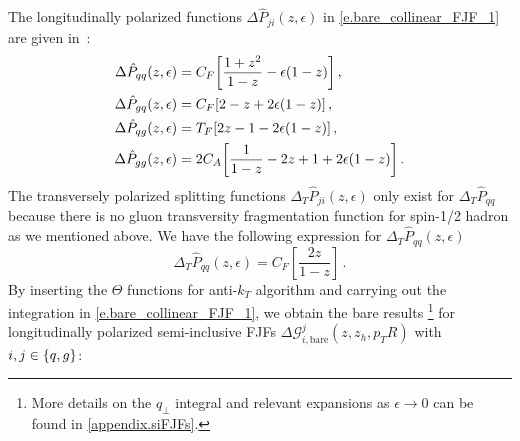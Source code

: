 \documentclass[a4paper, 11 pt]{article}
\begin{document}
The longitudinally polarized functions $\Delta  \hat{P}_{ji} (z , \epsilon)$ in \cref{e.bare_collinear_FJF_1} are given in~\cite{Vogelsang:1996im}:
\begin{align}
\Delta \hat{P}_{qq} (z, \epsilon)
& =
C_F \bqty{\frac{1 + z^2}{1 - z} - \epsilon (1 - z)}
\, , \label{e.Delta_P_qq} \\
\Delta \hat{P}_{gq} (z, \epsilon)
& =
C_F \bqty{2 - z + 2 \epsilon (1 - z)}
\, , \label{e.Delta_P_gq} \\
\Delta \hat{P}_{qg} (z, \epsilon)
& =
T_F \bqty{2 z - 1 - 2 \epsilon (1 - z)}
\, , \label{e.Delta_P_qg} \\
\Delta \hat{P}_{gg} (z, \epsilon)
& =
2 C_A \bqty{\frac{1}{1 - z} - 2 z + 1 + 2 \epsilon (1 - z)}
\, . \label{e.Delta_P_gg}
\end{align}
The transversely polarized splitting functions $\Delta _{T} \hat{P}_{ji} (z , \epsilon)$ only exist for $\Delta _{T} \hat{P}_{qq}$ because there is no gluon transversity fragmentation function for spin-1/2 hadron as we mentioned above. We have the following expression for $\Delta _{T} \hat{P}_{qq}(z , \epsilon)$~\cite{Vogelsang:1997ak}
\begin{equation}
\label{e.Delta_T_P_qq}
\Delta _T \hat{P}_{qq} (z, \epsilon)
=
C_F \left[\frac{2 z}{1 - z}\right]
\, .
\end{equation}
By inserting the $\Theta$ functions for anti-$k_T$ algorithm and carrying out the integration in \cref{e.bare_collinear_FJF_1}, we obtain the bare results%
\footnote{More details on the $q_{\perp}$ integral and relevant expansions as $\epsilon \to 0$ can be found in \cref{appendix.siFJFs}.}
for longitudinally polarized semi-inclusive FJFs $\Delta \mathcal{G}^{j}_{i, \mathrm{bare}} (z, z_h, p_TR)$ with $i, j \in \Bqty{q, g}$:
\end{document}
